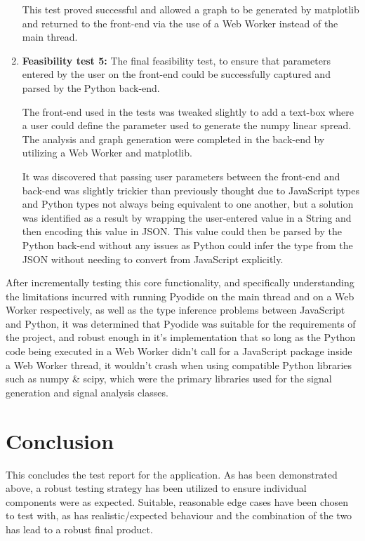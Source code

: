 \begin{enumerate}
    This test proved successful and allowed a graph to be generated by matplotlib and returned to the front-end via the use of a Web Worker instead of the main thread. 
    
    \item {\bf Feasibility test 5:} The final feasibility test, to ensure that parameters entered by the user on the front-end could be successfully captured and parsed by the Python back-end.
    
    The front-end used in the tests was tweaked slightly to add a text-box where a user could define the parameter used to generate the numpy linear spread. The analysis and graph generation were completed in the back-end by utilizing a Web Worker and matplotlib. 
    
    It was discovered that passing user parameters between the front-end and back-end was slightly trickier than previously thought due to JavaScript types and Python types not always being equivalent to one another, but a solution was identified as a result by wrapping the user-entered value in a String and then encoding this value in JSON. This value could then be parsed by the Python back-end without any issues as Python could infer the type from the JSON without needing to convert from JavaScript explicitly. 
\end{enumerate}

After incrementally testing this core functionality, and specifically understanding the limitations incurred with running Pyodide on the main thread and on a Web Worker respectively, as well as the type inference problems between JavaScript and Python, it was determined that Pyodide was suitable for the requirements of the project, and robust enough in it's implementation that so long as the Python code being executed in a Web Worker didn't call for a JavaScript package inside a Web Worker thread, it wouldn't crash when using compatible Python libraries such as numpy \& scipy, which were the primary libraries used for the signal generation and signal analysis classes.  

\section{Conclusion}
This concludes the test report for the application. As has been demonstrated above, a robust testing strategy has been utilized to ensure individual components were as expected. Suitable, reasonable edge cases have been chosen to test with, as has realistic/expected behaviour and the combination of the two has lead to a robust final product.

